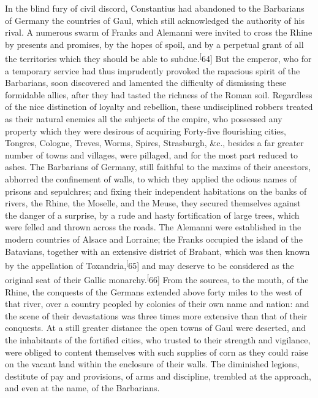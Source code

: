 In the blind fury of civil discord, Constantius had abandoned to
the Barbarians of Germany the countries of Gaul, which still
acknowledged the authority of his rival. A numerous swarm of
Franks and Alemanni were invited to cross the Rhine by presents
and promises, by the hopes of spoil, and by a perpetual grant of
all the territories which they should be able to subdue.\textsuperscript[64] But
the emperor, who for a temporary service had thus imprudently
provoked the rapacious spirit of the Barbarians, soon discovered
and lamented the difficulty of dismissing these formidable
allies, after they had tasted the richness of the Roman soil.
Regardless of the nice distinction of loyalty and rebellion,
these undisciplined robbers treated as their natural enemies all
the subjects of the empire, who possessed any property which they
were desirous of acquiring Forty-five flourishing cities,
Tongres, Cologne, Treves, Worms, Spires, Strasburgh, \&c., besides
a far greater number of towns and villages, were pillaged, and
for the most part reduced to ashes. The Barbarians of Germany,
still faithful to the maxims of their ancestors, abhorred the
confinement of walls, to which they applied the odious names of
prisons and sepulchres; and fixing their independent habitations
on the banks of rivers, the Rhine, the Moselle, and the Meuse,
they secured themselves against the danger of a surprise, by a
rude and hasty fortification of large trees, which were felled
and thrown across the roads. The Alemanni were established in the
modern countries of Alsace and Lorraine; the Franks occupied the
island of the Batavians, together with an extensive district of
Brabant, which was then known by the appellation of Toxandria,\textsuperscript[65]
and may deserve to be considered as the original seat of their
Gallic monarchy.\textsuperscript[66] From the sources, to the mouth, of the Rhine,
the conquests of the Germans extended above forty miles to the
west of that river, over a country peopled by colonies of their
own name and nation: and the scene of their devastations was
three times more extensive than that of their conquests. At a
still greater distance the open towns of Gaul were deserted, and
the inhabitants of the fortified cities, who trusted to their
strength and vigilance, were obliged to content themselves with
such supplies of corn as they could raise on the vacant land
within the enclosure of their walls. The diminished legions,
destitute of pay and provisions, of arms and discipline, trembled
at the approach, and even at the name, of the Barbarians.

